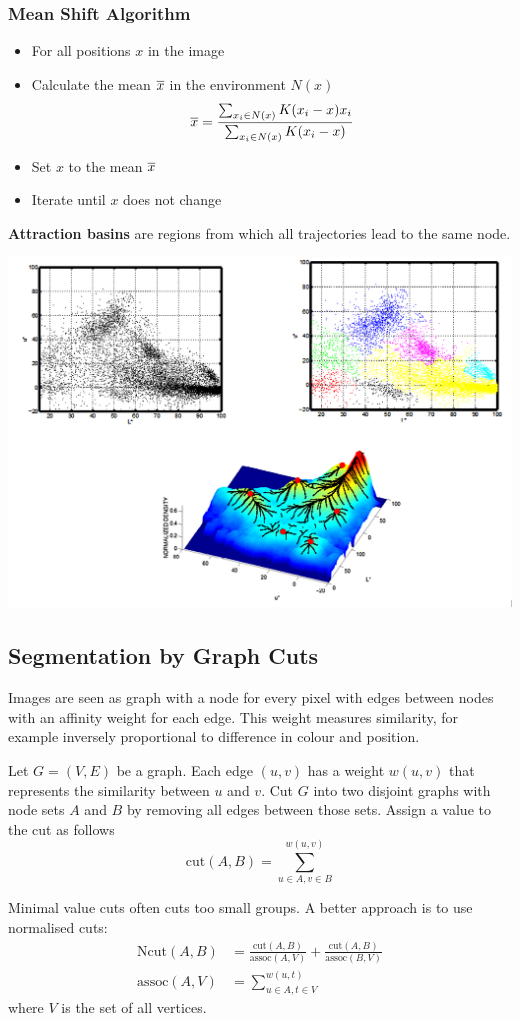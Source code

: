 \subsubsection{Mean Shift Algorithm}
\begin{itemize}[label=-]
	\item[] For all positions $x$ in the image
	\item Calculate the mean $\overline{x}$ in the environment $N(x)$
	\begin{equation*}
		\overline{x} = \frac{\sum_{x_i \in N(x)} K(x_i - x) x_i }{\sum_{x_i \in N(x)} K(x_i - x)}
	\end{equation*}
	\item Set $x$ to the mean $\overline{x}$
	\item Iterate until $x$ does not change
\end{itemize}
\textbf{Attraction basins} are regions from which all trajectories lead to the same node.
\begin{center}
	\includegraphics[width=0.7\linewidth]{img/attraction_basins}
\end{center}

\subsection{Segmentation by Graph Cuts}
Images are seen as graph with a node for every pixel with edges between nodes with an affinity weight for each edge.
This weight  measures similarity, for example inversely proportional to difference in colour and position.
\begin{definition}
	Let $G=(V,E)$ be a graph. Each edge $(u,v)$ has a weight $w(u,v)$ that represents the similarity between $u$ and $v$.
	Cut $G$ into two disjoint graphs with node sets $A$ and $B$ by removing all edges between those sets. Assign a value to the cut as follows
	\begin{equation*}
		\text{cut}(A,B) = \sum_{u\in A,v\in B}^{w(u,v)}
	\end{equation*}
\end{definition}
Minimal value cuts often cuts too small groups. A better approach is to use normalised cuts:
\begin{align*}
	\text{Ncut}(A,B) &= \frac{\text{cut}(A,B)}{\text{assoc}(A,V)} + \frac{\text{cut}(A,B)}{\text{assoc}(B,V)}\\
	\text{assoc}(A,V) &= \sum_{u\in A, t\in V}^{w(u,t)}
\end{align*}
where $V$ is the set of all vertices.

